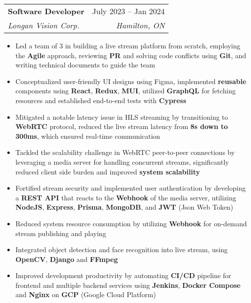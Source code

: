 \documentclass[letterpaper,11pt]{article}
\makeatletter
\newcommand{\resumeItem}[1]{
  \item\small{
    {#1 \vspace{-2pt}}
  }
}
\newcommand{\resumeSubheading}[4]{
  \vspace{-2pt}\item
    \begin{tabular*}{0.97\textwidth}[t]{l@{\extracolsep{\fill}}r}
      \textbf{#1} & #2 \\
      \textit{\small#3} & \textit{\small #4} \\
    \end{tabular*}\vspace{-7pt}
}
\newcommand{\resumeItemListStart}{\begin{itemize}}
\newcommand{\resumeItemListEnd}{\end{itemize}\vspace{-5pt}}
\makeatother
\begin{document}
    \resumeSubheading
      {Software Developer}{July 2023 -- Jan 2024}
      {Longan Vision Corp.}{Hamilton, ON}
      \resumeItemListStart
        \resumeItem{Led a team of 3 in building a live stream platform from scratch, employing the \textbf{Agile} approach, reviewing \textbf{PR} and solving code conflicts using \textbf{Git}, and writing technical documents to guide the team}
        \resumeItem{Conceptualized user-friendly UI designs using Figma, implemented \textbf{reusable} components using \textbf{React}, \textbf{Redux}, \textbf{MUI}, utilized \textbf{GraphQL} for fetching resources and established end-to-end tests with \textbf{Cypress}}
        \resumeItem{Mitigated a notable latency issue in HLS streaming by transitioning to \textbf{WebRTC} protocol, reduced the live stream latency from \textbf{8s down to 300ms}, which ensured real-time communication}
        \resumeItem{Tackled the scalability challenge in WebRTC peer-to-peer connections by leveraging a media server for handling concurrent streams, significantly reduced client side burden and improved \textbf{system scalability}}
        \resumeItem{Fortified stream security and implemented user authentication by developing a \textbf{REST API} that reacts to the \textbf{Webhook} of the media server, utilizing \textbf{NodeJS}, \textbf{Express}, \textbf{Prisma}, \textbf{MongoDB}, and \textbf{JWT} (Json Web Token)}
        \resumeItem{Reduced system resource consumption by utilizing \textbf{Webhook} for on-demand stream publishing and playing}
        \resumeItem{Integrated object detection and face recognition into live stream, using \textbf{OpenCV}, \textbf{Django} and \textbf{FFmpeg}}
        \resumeItem{Improved development productivity by automating \textbf{CI/CD} pipeline for frontend and multiple backend services using \textbf{Jenkins}, \textbf{Docker Compose} and \textbf{Nginx} on \textbf{GCP} (Google Cloud Platform)}
    \resumeItemListEnd
\end{document}
